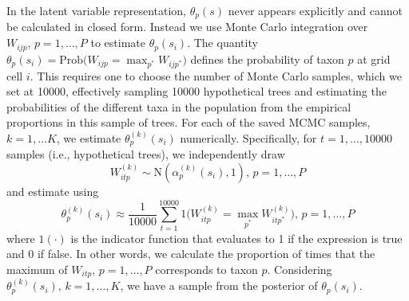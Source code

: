 \documentclass[12pt]{article}
\begin{document}
In the latent variable representation, $\theta_{p}(s)$ never appears
explicitly and cannot be calculated in closed form. Instead we use
Monte Carlo integration over $W_{ijp},\, p=1,\ldots,P$ to estimate
$\theta_{p}(s_{i})$. The quantity $\theta_{p}(s_{i})=\mbox{Prob}(W_{ijp}={\displaystyle \max_{p^{*}}W_{ijp^{*}})}$
defines the probability of taxon $p$ at grid cell $i$. This requires
one to choose the number of Monte Carlo samples, which we set at 10000,
effectively sampling 10000 hypothetical trees and estimating the probabilities
of the different taxa in the population from the empirical proportions
in this sample of trees. For each of the saved MCMC samples, $k=1,\ldots K$,
we estimate $\theta_{p}^{(k)}(s_{i})$ numerically. Specifically,
for $t=1,\ldots,10000$ samples (i.e., hypothetical trees), we independently
draw
\[
W_{itp}^{(k)}\sim\mbox{N}(\alpha_{p}^{(k)}(s_{i}),1),\, p=1,\ldots,P
\]
and estimate using 
\[
\theta_{p}^{(k)}(s_{i})\approx\frac{1}{10000}{\displaystyle \sum_{t=1}^{10000}1(W_{itp}^{(k)}={\displaystyle \max_{p^{*}}W_{itp^{*}}^{(k)})}},\, p=1,\ldots,P
\]
where $1(\cdot)$ is the indicator function that evaluates to 1 if
the expression is true and 0 if false. In other words, we calculate
the proportion of times that the maximum of $W_{itp},\, p=1,\ldots,P$
corresponds to taxon $p$. Considering $\theta_{p}^{(k)}(s_{i}),\, k=1,\ldots,K$,
we have a sample from the posterior of $\theta_{p}(s_{i})$.
\end{document}
